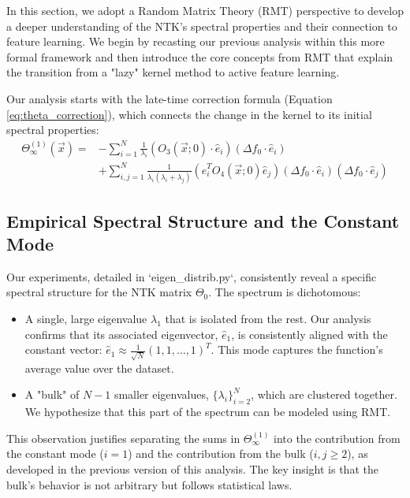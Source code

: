 \documentclass[a4paper]{article}
\begin{document}
In this section, we adopt a Random Matrix Theory (RMT) perspective to develop a deeper understanding of the NTK's spectral properties and their connection to feature learning. We begin by recasting our previous analysis within this more formal framework and then introduce the core concepts from RMT that explain the transition from a "lazy" kernel method to active feature learning.

Our analysis starts with the late-time correction formula (Equation \ref{eq:theta_correction}), which connects the change in the kernel to its initial spectral properties:
\begin{align*}
\Theta^{(1)}_\infty(\vec{x}) = & -\sum_{i=1}^N \frac{1}{\lambda_{i}}(O_{3}(\vec{x};0)\cdot\hat{e}_{i})(\Delta f_{0}\cdot\hat{e}_{i}) \\
& + \sum_{i,j=1}^N\frac{1}{\lambda_{i}(\lambda_{i}+\lambda_{j})}(\hat{e}_{i}^{T}O_{4}(\vec{x};0)\hat{e}_{j})(\Delta f_{0}\cdot \hat{e}_{i})(\Delta f_{0}\cdot \hat{e}_{j})
\end{align*}

\subsection{Empirical Spectral Structure and the Constant Mode}
Our experiments, detailed in `eigen_distrib.py`, consistently reveal a specific spectral structure for the NTK matrix $\Theta_0$. The spectrum is dichotomous:
\begin{itemize}
    \item A single, large eigenvalue $\lambda_1$ that is isolated from the rest. Our analysis confirms that its associated eigenvector, $\hat{e}_1$, is consistently aligned with the constant vector: $\hat{e}_1 \approx \frac{1}{\sqrt{N}}(1, 1, \dots, 1)^T$. This mode captures the function's average value over the dataset.
    \item A "bulk" of $N-1$ smaller eigenvalues, $\{\lambda_i\}_{i=2}^N$, which are clustered together. We hypothesize that this part of the spectrum can be modeled using RMT.
\end{itemize}
This observation justifies separating the sums in $\Theta^{(1)}_\infty$ into the contribution from the constant mode ($i=1$) and the contribution from the bulk ($i,j \ge 2$), as developed in the previous version of this analysis. The key insight is that the bulk's behavior is not arbitrary but follows statistical laws.
\end{document}
